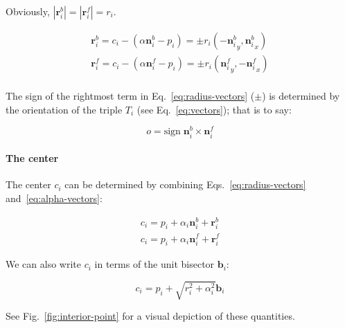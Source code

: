 \documentclass{article}
\begin{document}
Obviously, $\left|\mathbf{r}^{b}_{i}\right| = \left|\mathbf{r}^{f}_{i}\right| = r_{i}$.

\begin{equation}
  \label{eq:radius-vectors}
   \begin{split}
     \mathbf{r}^{b}_{i} = c_{i} - \left(\alpha\mathbf{n}^{b}_{i} - p_{i}\right)=\pm r_i\left( -{\mathbf{n}^{b}_{i}}_{y},  {\mathbf{n}^{b}_{i}}_{x} \right)\\
     \mathbf{r}^{f}_{i} = c_{i} - \left(\alpha\mathbf{n}^{f}_{i} - p_{i}\right)=\pm r_i\left(  {\mathbf{n}^{f}_{i}}_{y}, -{\mathbf{n}^{f}_{i}}_{x} \right)\\
   \end{split}
\end{equation}

The sign of the rightmost term in Eq.~\eqref{eq:radius-vectors} ($\pm$) is determined by the orientation of the triple $T_i$ (see Eq.~\eqref{eq:vectors}); that is to say:

\begin{equation}
  \label{eq:orientation}
  o = \mathrm{sign}\; \mathbf{n}^{b}_{i} \times \mathbf{n}^{f}_{i}
\end{equation}

\paragraph{The center}

The center $c_{i}$ can be determined by combining Eqs.~\eqref{eq:radius-vectors} and~\eqref{eq:alpha-vectors}:

\begin{equation}
  \label{eq:center-vectors}
  \begin{split}
    c_{i} = p_{i} + \alpha_i\mathbf{n}^b_i + \mathbf{r}^{b}_{i}\\
    c_{i} = p_{i} + \alpha_i\mathbf{n}^f_i + \mathbf{r}^{f}_{i}
  \end{split}
\end{equation}

We can also write $c_{i}$ in terms of the unit bisector $\mathbf{b}_{i}$:

\begin{equation}
  \label{eq:center-bisector}
  c_{i} = p_{i} + \sqrt{r_{i}^{2} + \alpha_{i}^{2}}\mathbf{b}_{i}
\end{equation}

See Fig.~\ref{fig:interior-point} for a visual depiction of these quantities.
\end{document}

